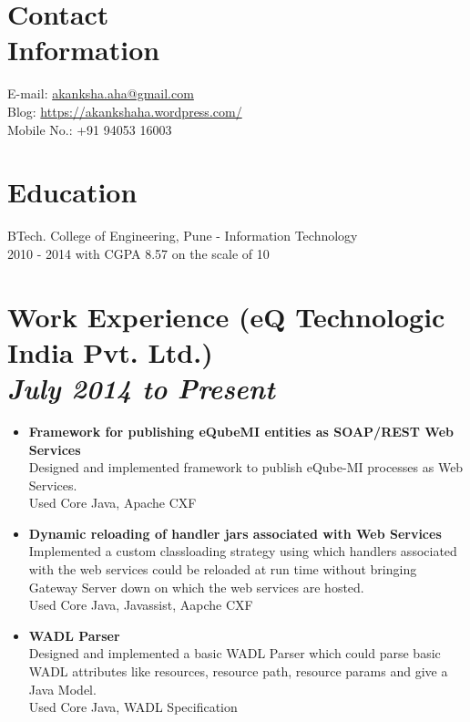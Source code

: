 \documentclass[margin,line]{res}
\begin{document}

\begin{resume}

\section{Contact\\Information}  
E-mail: \href{mailto:akanksha.aha@gmail.com}{akanksha.aha@gmail.com}\\
Blog: \url{https://akankshaha.wordpress.com/}\\
Mobile No.: +91 94053 16003

\section{Education}
BTech. College of Engineering, Pune - Information Technology\\
2010 - 2014 with CGPA 8.57 on the scale of 10

\section{Work Experience (eQ Technologic India Pvt. Ltd.)\\
\emph {July 2014 to Present}}
\begin{itemize} \itemsep -4pt

\item \textbf{Framework for publishing eQubeMI entities as SOAP/REST Web\\ Services}\\
Designed and implemented framework to publish eQube-MI processes as Web Services.\\
Used Core Java, Apache CXF\\

\item \textbf{Dynamic reloading of handler jars associated with Web Services}\\
Implemented a custom classloading strategy using which handlers associated with the web services could be reloaded at run time without bringing Gateway Server down on which the web services are hosted. \\
Used Core Java, Javassist, Aapche CXF\\

\item \textbf{WADL Parser}\\
Designed and implemented a basic WADL Parser which could parse basic WADL attributes like resources, resource path, resource params and give a Java Model.\\
Used Core Java, WADL Specification\\


\end{itemize}
\end{resume}
\end{document}
